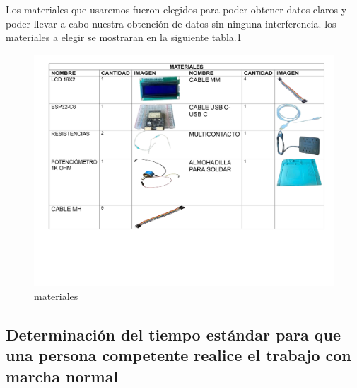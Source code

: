 Los materiales que usaremos fueron elegidos para poder obtener datos claros y poder llevar a cabo nuestra obtención de datos sin ninguna interferencia. los materiales a elegir se mostraran en la siguiente tabla.\ref{fig:materiales}
\begin{figure}[H]
    \centering
    \includegraphics[scale=0.30]{13/img/materiales.pdf}
    \caption{materiales}
    \label{fig:materiales}
\end{figure}
% 
\subsection{Determinación del tiempo estándar para que una persona competente realice el trabajo con marcha normal}

% 
% 



% 
% 

